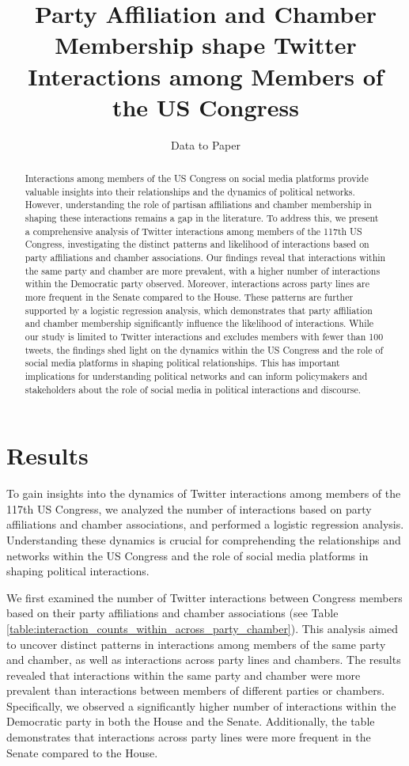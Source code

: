 \documentclass[11pt]{article}
\title{Party Affiliation and Chamber Membership shape Twitter Interactions among Members of the US Congress}
\author{Data to Paper}
\begin{document}
\maketitle
\begin{abstract}
Interactions among members of the US Congress on social media platforms provide valuable insights into their relationships and the dynamics of political networks. However, understanding the role of partisan affiliations and chamber membership in shaping these interactions remains a gap in the literature. To address this, we present a comprehensive analysis of Twitter interactions among members of the 117th US Congress, investigating the distinct patterns and likelihood of interactions based on party affiliations and chamber associations. Our findings reveal that interactions within the same party and chamber are more prevalent, with a higher number of interactions within the Democratic party observed. Moreover, interactions across party lines are more frequent in the Senate compared to the House. These patterns are further supported by a logistic regression analysis, which demonstrates that party affiliation and chamber membership significantly influence the likelihood of interactions. While our study is limited to Twitter interactions and excludes members with fewer than 100 tweets, the findings shed light on the dynamics within the US Congress and the role of social media platforms in shaping political relationships. This has important implications for understanding political networks and can inform policymakers and stakeholders about the role of social media in political interactions and discourse.
\end{abstract}
\section*{Results}

To gain insights into the dynamics of Twitter interactions among members of the 117th US Congress, we analyzed the number of interactions based on party affiliations and chamber associations, and performed a logistic regression analysis. Understanding these dynamics is crucial for comprehending the relationships and networks within the US Congress and the role of social media platforms in shaping political interactions.

We first examined the number of Twitter interactions between Congress members based on their party affiliations and chamber associations (see Table {}\ref{table:interaction_counts_within_across_party_chamber}). This analysis aimed to uncover distinct patterns in interactions among members of the same party and chamber, as well as interactions across party lines and chambers. The results revealed that interactions within the same party and chamber were more prevalent than interactions between members of different parties or chambers. Specifically, we observed a significantly higher number of interactions within the Democratic party in both the House and the Senate. Additionally, the table demonstrates that interactions across party lines were more frequent in the Senate compared to the House.
\end{document}
